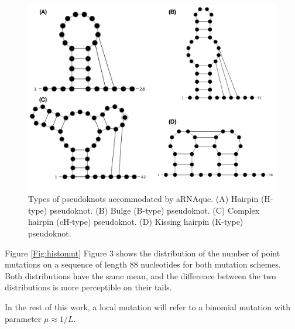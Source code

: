 \begin{figure}[t!]
	\centering
	\includegraphics[width=1.0 \linewidth]{../res/images/arnaque/pk_type.pdf}
	\caption{Types of pseudoknots accommodated by aRNAque. (A) Hairpin (H-type) pseudoknot. (B) Bulge (B-type) pseudoknot. (C) Complex hairpin (cH-type) pseudoknot. (D) Kissing hairpin  (K-type) pseudoknot.\label{Fig:pk_type}}
	
\end{figure}
Figure \ref{Fig:histomut} Figure 3 shows the distribution of the number of point mutations on a sequence of length $88$ nucleotides for both mutation schemes. Both distributions have the same mean, and the difference between the two distributions is more perceptible on their tails. 

In the rest of this work, a local mutation will refer to a binomial mutation with parameter $\mu \approx 1/L$.


